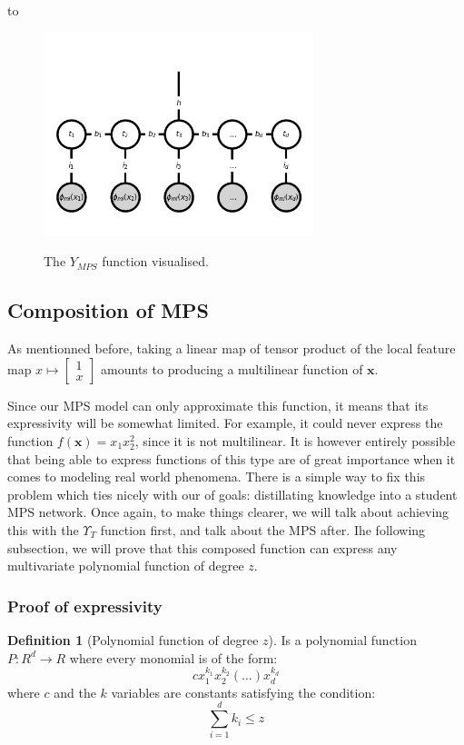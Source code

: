 \documentclass{article}
\theoremstyle{definition}
\newtheorem{definition}{Definition}[section]
\theoremstyle{definition}
\begin{document}
to 
\begin{figure}[hbt!]
    \centering
    \caption{The $Y_{MPS}$ function visualised.}
    \includegraphics[width=0.7\textwidth]{images/2023-04-20-12-41-57.png}
    \label{fig:mps_tensor_model}
\end{figure}

\subsection{Composition of MPS}
As mentionned before, taking a linear map of  tensor product of the local feature map 
$ x \mapsto \begin{bmatrix} 1 \\ x \end{bmatrix} $ amounts to producing a multilinear function of $\mathbf{x}$.

Since our MPS model can only approximate this function, it means that its expressivity
will be somewhat limited. For example, it could never express the function $f(\mathbf{x}) = x_1x_2^2$, since it is not multilinear. It is however entirely possible that being able to express functions of this type are of great importance when it comes to modeling real world phenomena. There is a simple way to fix this problem which ties nicely with our of goals: distillating knowledge into a student MPS network. Once again, to make things clearer, we will talk about achieving this with the $\Upsilon_{T}$ function first, and talk about the MPS after. Ihe following subsection, we will prove that this composed function can express
any multivariate polynomial function of degree $z$.

\subsubsection{Proof of expressivity}
\begin{definition}[Polynomial function of degree $z$]

    Is a polynomial function $P: R^d \to R$ where every monomial is of the form:
    \[
        cx_1^{k_1} x_2^{k_2}(\dots)x_d^{k_d}
    \]
    where $c$ and the $k$ variables are constants satisfying the condition:
    \[
        \sum_{i=1}^{d}k_i \leq z
    \]
\end{definition}
\end{document}
